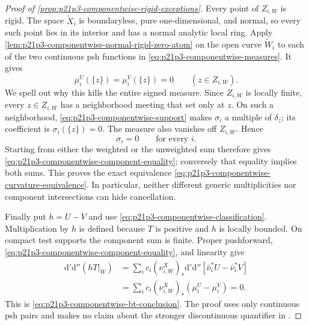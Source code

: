 \begin{proof}[Proof of
\cref{prop:p21p3-componentwise-rigid-exceptions}]
Every point of $Z_{i,W}$ is rigid.  The space $\widetilde X_i$ is
boundaryless, pure one-dimensional, and normal, so every such point lies in
its interior and has a normal analytic local ring.  Apply
\cref{lem:p21p3-componentwise-normal-rigid-zero-atom} on the open curve
$\widetilde W_i$ to each of the two continuous psh functions in
\eqref{eq:p21p3-componentwise-measures}.  It gives
\[
                         \mu_i^U(\{z\})
                         =\mu_i^V(\{z\})=0
                         \qquad(z\in Z_{i,W}).
\]
We spell out why this kills the entire signed measure.  Since $Z_{i,W}$ is
locally finite, every $z\in Z_{i,W}$ has a neighborhood meeting that set
only at $z$.  On such a neighborhood,
\eqref{eq:p21p3-componentwise-support} makes $\sigma_i$ a multiple of
$\delta_z$; its coefficient is
$\sigma_i(\{z\})=0$.  The measure also vanishes off $Z_{i,W}$.  Hence
\begin{equation}
 \label{eq:p21p3-componentwise-component-equality}
                            \sigma_i=0
                            \qquad\text{for every }i.
\end{equation}
Starting from either the weighted or the unweighted sum therefore gives
\eqref{eq:p21p3-componentwise-component-equality}; conversely that equality
implies both sums.  This proves the exact equivalence
\eqref{eq:p21p3-componentwise-curvature-equivalence}.  In particular,
neither different generic multiplicities nor component intersections can
hide cancellation.

Finally put $h=U-V$ and use
\eqref{eq:p21p3-componentwise-classification}.  Multiplication by $h$ is
defined because $T$ is positive and $h$ is locally bounded.  On compact
test supports the component sum is finite.  Proper pushforward,
\eqref{eq:p21p3-componentwise-component-equality}, and linearity give
\begin{align*}
 \mathrm d'\mathrm d''(hT|_W)
 &=\sum_i c_i(\nu_{i,W}^X)_*
       \mathrm d'\mathrm d''[\bar\nu_i^*U-\bar\nu_i^*V]\\
 &=\sum_i c_i(\nu_{i,W}^X)_*(\mu_i^U-\mu_i^V)=0.
\end{align*}
This is \eqref{eq:p21p3-componentwise-bt-conclusion}.  The proof uses only
continuous psh pairs and makes no claim about the stronger discontinuous
quantifier in \cite[Definition~8.6.2]{CLD25}.
\end{proof}
